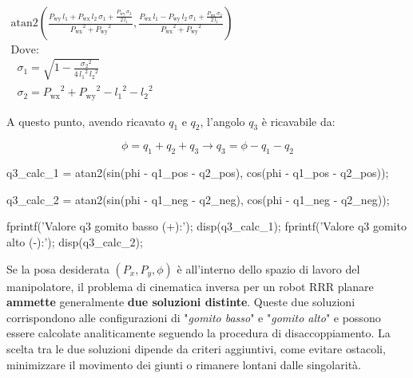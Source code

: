 \documentclass[11pt, a4paper]{article}
\begin{document}
\begin{matlabsymbolicoutput}
$\displaystyle \begin{array}{l}
\textrm{atan2}\left(\frac{P_{\textrm{wy}} \,l_1 +P_{\textrm{wx}} \,l_2 \,\sigma_1 +\frac{P_{\textrm{wy}} \,\sigma_2 }{2\,l_1 }}{{P_{\textrm{wx}} }^2 +{P_{\textrm{wy}} }^2 },\frac{P_{\textrm{wx}} \,l_1 -P_{\textrm{wy}} \,l_2 \,\sigma_1 +\frac{P_{\textrm{wx}} \,\sigma_2 }{2\,l_1 }}{{P_{\textrm{wx}} }^2 +{P_{\textrm{wy}} }^2 }\right)\\
\textrm{Dove:}\\
\;\;\sigma_1 =\sqrt{1-\frac{{\sigma_2 }^2 }{4\,{l_1 }^2 \,{l_2 }^2 }}\\
\;\;\sigma_2 ={P_{\textrm{wx}} }^2 +{P_{\textrm{wy}} }^2 -{l_1 }^2 -{l_2 }^2
\end{array}$
\end{matlabsymbolicoutput}


\begin{par}
\begin{flushleft}
A questo punto, avendo ricavato $q_1$ e $q_2$, l'angolo $q_3$ è ricavabile da:
\end{flushleft}
\end{par}
\[
    \phi = q_1 + q_2 + q_3 \longrightarrow q_3 = \phi - q_1 - q_2
\]
\begin{matlabcode}
q3_calc_1 = atan2(sin(phi - q1_pos - q2_pos), cos(phi - q1_pos - q2_pos));

q3_calc_2 = atan2(sin(phi - q1_neg - q2_neg), cos(phi - q1_neg - q2_neg));

fprintf('Valore q3 gomito basso (+):\n');
disp(q3_calc_1);
fprintf('Valore q3 gomito alto (-):\n');
disp(q3_calc_2);
\end{matlabcode}

\begin{par}
\begin{flushleft}
Se la posa desiderata $(P_x ,P_y ,\phi )$ è all'interno dello spazio di lavoro del manipolatore, il problema di cinematica inversa per un robot RRR planare \textbf{ammette} generalmente \textbf{due soluzioni distinte}. Queste due soluzioni corrispondono alle configurazioni di "\textit{gomito basso}" e "\textit{gomito alto}" e possono essere calcolate analiticamente seguendo la procedura di disaccoppiamento. La scelta tra le due soluzioni dipende da criteri aggiuntivi, come evitare ostacoli, minimizzare il movimento dei giunti o rimanere lontani dalle singolarità.
\end{flushleft}
\end{par}
\end{document}
